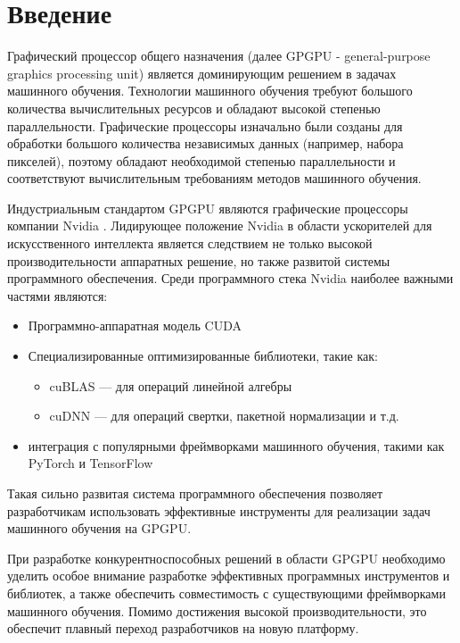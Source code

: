 \section{Введение}
Графический процессор общего назначения (далее GPGPU - general-purpose graphics processing unit) является доминирующим решением
в задачах машинного обучения. Технологии машинного обучения требуют большого количества вычислительных ресурсов и обладают высокой
степенью параллельности. Графические процессоры изначально были созданы для обработки большого количества независимых данных
(например, набора пикселей), поэтому обладают необходимой степенью параллельности и соответствуют вычислительным требованиям
методов машинного обучения.

Индустриальным стандартом GPGPU являются графические процессоры компании Nvidia \cite{nvidia_2025}. Лидирующее положение Nvidia в области
ускорителей для искусственного интеллекта является следствием не только высокой производительности аппаратных решение, но также
развитой системы программного обеспечения. Среди программного стека Nvidia наиболее важными частями являются:
\begin{itemize}
    \item Программно-аппаратная модель CUDA \cite{cuda_guide_2025}
    \item Специализированные оптимизированные библиотеки, такие как:
    \begin{itemize}
        \item cuBLAS \cite{cublas_2025} — для операций линейной алгебры
        \item cuDNN \cite{cudnn_2025} — для операций свертки, пакетной нормализации и т.д.
    \end{itemize}
    \item интеграция с популярными фреймворками машинного обучения, такими как \\
          PyTorch \cite{pytorch_2025} и TensorFlow \cite{tensorflow_2025}
\end{itemize}
Такая сильно развитая система программного обеспечения позволяет разработчикам использовать эффективные инструменты для реализации задач машинного
обучения на GPGPU.

При разработке конкурентноспособных решений в области GPGPU необходимо уделить особое внимание разработке эффективных
программных инструментов и библиотек, а также обеспечить совместимость с существующими фреймворками машинного обучения.
Помимо достижения высокой производительности, это обеспечит плавный переход разработчиков на новую платформу.

